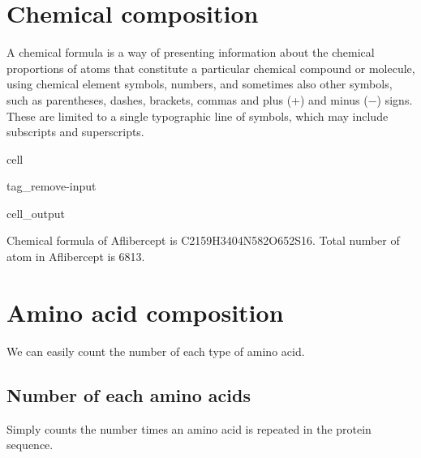 \documentclass[letterpaper,10pt,english]{jupyterBook}
\begin{document}
\section{Chemical composition}
\label{\detokenize{ipynb/chapter1:chemical-composition}}
\sphinxAtStartPar
A chemical formula is a way of presenting information about the chemical proportions of atoms that constitute a particular chemical compound or molecule, using chemical element symbols, numbers, and sometimes also other symbols, such as parentheses, dashes, brackets, commas and plus (+) and minus (−) signs. These are limited to a single typographic line of symbols, which may include subscripts and superscripts.

\begin{sphinxuseclass}{cell}
\begin{sphinxuseclass}{tag_remove-input}\begin{sphinxVerbatimOutput}

\begin{sphinxuseclass}{cell_output}
\begin{sphinxVerbatim}[commandchars=\\\{\}]
Chemical formula of Aflibercept is C2159H3404N582O652S16.
Total number of atom in Aflibercept is 6813.
\end{sphinxVerbatim}

\end{sphinxuseclass}\end{sphinxVerbatimOutput}

\end{sphinxuseclass}
\end{sphinxuseclass}

\section{Amino acid composition}
\label{\detokenize{ipynb/chapter1:amino-acid-composition}}
\sphinxAtStartPar
We can easily count the number of each type of amino acid.


\subsection{Number of each amino acids}
\label{\detokenize{ipynb/chapter1:number-of-each-amino-acids}}
\sphinxAtStartPar
Simply counts the number times an amino acid is repeated in the protein sequence.
\end{document}
